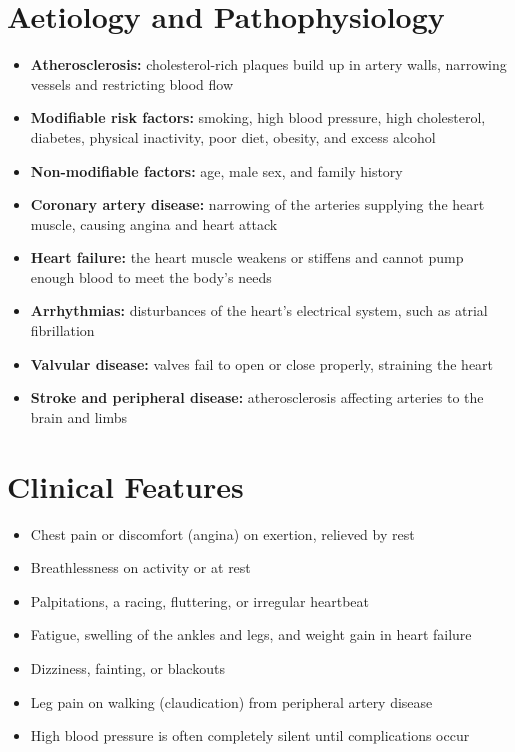 \section*{Aetiology and Pathophysiology}
\begin{itemize}
    \item \textbf{Atherosclerosis:} cholesterol-rich plaques build up in artery walls, narrowing vessels and restricting blood flow
    \item \textbf{Modifiable risk factors:} smoking, high blood pressure, high cholesterol, diabetes, physical inactivity, poor diet, obesity, and excess alcohol
    \item \textbf{Non-modifiable factors:} age, male sex, and family history
    \item \textbf{Coronary artery disease:} narrowing of the arteries supplying the heart muscle, causing angina and heart attack
    \item \textbf{Heart failure:} the heart muscle weakens or stiffens and cannot pump enough blood to meet the body's needs
    \item \textbf{Arrhythmias:} disturbances of the heart's electrical system, such as atrial fibrillation
    \item \textbf{Valvular disease:} valves fail to open or close properly, straining the heart
    \item \textbf{Stroke and peripheral disease:} atherosclerosis affecting arteries to the brain and limbs
\end{itemize}

\section*{Clinical Features}
\begin{itemize}
    \item Chest pain or discomfort (angina) on exertion, relieved by rest
    \item Breathlessness on activity or at rest
    \item Palpitations, a racing, fluttering, or irregular heartbeat
    \item Fatigue, swelling of the ankles and legs, and weight gain in heart failure
    \item Dizziness, fainting, or blackouts
    \item Leg pain on walking (claudication) from peripheral artery disease
    \item High blood pressure is often completely silent until complications occur
\end{itemize}

